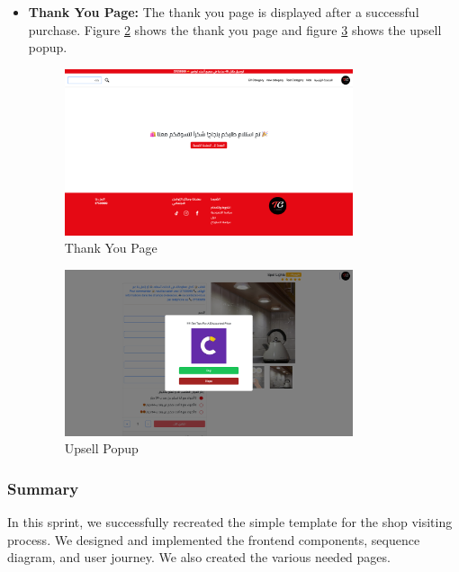 \begin{itemize}
\begin{figure}[H]
        \label{fig:product_detail_page_three}
    \end{figure}
    \item \textbf{Thank You Page:} The thank you page is displayed after a successful purchase. Figure \ref{fig:thank_you_page} shows the thank you page and figure \ref{fig:upsell} shows the upsell popup.
    \begin{figure}[H]
        \centering
        \includegraphics[width=0.8\textwidth]{images/thankYouPage.png}
        \caption{Thank You Page}
        \label{fig:thank_you_page}
    \end{figure}
    \begin{figure}[H]
        \centering
        \includegraphics[width=0.8\textwidth]{images/upsell.png}
        \caption{Upsell Popup}
        \label{fig:upsell}
    \end{figure}
\end{itemize}

\subsubsection{Summary}

In this sprint, we successfully recreated the simple template for the shop visiting process. We designed and implemented the frontend components, sequence diagram, and user journey. We also created the various needed pages.

